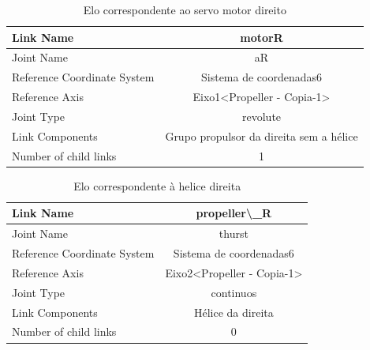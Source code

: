 \begin{table}[htbp]
\centering
\begin{tabular}{|l|c|c|c|c|}
\hline
Link Name & \multicolumn{4}{c|}{ motorR} \\
\hline
Joint Name & \multicolumn{4}{c|}{aR} \\
\hline
Reference Coordinate System  & \multicolumn{4}{c|}{Sistema de coordenadas6} \\
\hline
Reference Axis  & \multicolumn{4}{c|}{Eixo1<Propeller - Copia-1>} \\
\hline
Joint Type  & \multicolumn{4}{c|}{revolute} \\
\hline
Link Components   & \multicolumn{4}{c|}{Grupo propulsor da direita sem a hélice} \\
\hline
Number of child links  & \multicolumn{4}{c|}{1} \\
\hline
\end{tabular}%
\caption{Elo correspondente ao servo motor direito}
\label{tab:servodireito}%
\end{table}%

\begin{table}[htbp]
\centering
\begin{tabular}{|l|c|c|c|c|}
\hline
Link Name  & \multicolumn{4}{c|}{propeller\textbackslash{}\_R} \\
\hline
Joint Name  & \multicolumn{4}{c|}{thurst} \\
\hline
Reference Coordinate System   & \multicolumn{4}{c|}{Sistema de coordenadas6} \\
\hline
Reference Axis  & \multicolumn{4}{c|}{Eixo2<Propeller - Copia-1>} \\
\hline
Joint Type  & \multicolumn{4}{c|}{continuos} \\
\hline
Link Components   & \multicolumn{4}{c|}{Hélice da direita} \\
\hline
Number of child links  & \multicolumn{4}{c|}{0} \\
\hline
\end{tabular}%
\caption{Elo correspondente à helice direita}
\label{tab:helicedireita}%
\end{table}%

